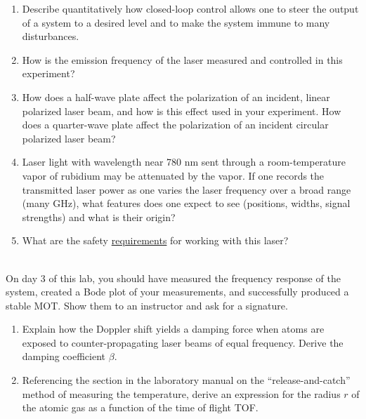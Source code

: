 \documentclass{../signatures}
\begin{document}
\maketitle

\names

\prelab

\begin{enumerate}

    \item Describe quantitatively how closed-loop control allows one to steer the output of a system to a desired level and to make the system immune to many disturbances.
    
    \item How is the emission frequency of the laser measured and controlled in this experiment?

    \item How does a half-wave plate affect the polarization of an incident, linear polarized laser beam, and how is this effect used in your experiment. How does a quarter-wave plate affect the polarization of an incident circular polarized laser beam?

    \item Laser light with wavelength near 780 nm sent through a room-temperature vapor of rubidium may be attenuated by the vapor. If one records the transmitted laser power as one varies the laser frequency over a broad range (many GHz), what features does one expect to see (positions, widths, signal strengths) and what is their origin?

    \item What are the safety \underline{requirements} for working with this laser?
       \\[36pt]
\end{enumerate}

\prelabsignatures

\midlab
\\
On day 3 of this lab, you should have measured the frequency response of the system, created a Bode plot of your measurements, and successfully produced a stable MOT. Show them to an instructor and ask for a signature.

\begin{enumerate}
    \item Explain how the Doppler shift yields a damping force when atoms are exposed to counter-propagating laser beams of equal frequency. Derive the damping coefficient $\beta$.
    
    \item Referencing the section in the laboratory manual on the ``release-and-catch'' method of measuring the temperature, derive an expression for the radius $r$ of the atomic gas as a function of the time of flight TOF.
\\[36pt]
\end{enumerate}
\end{document}
